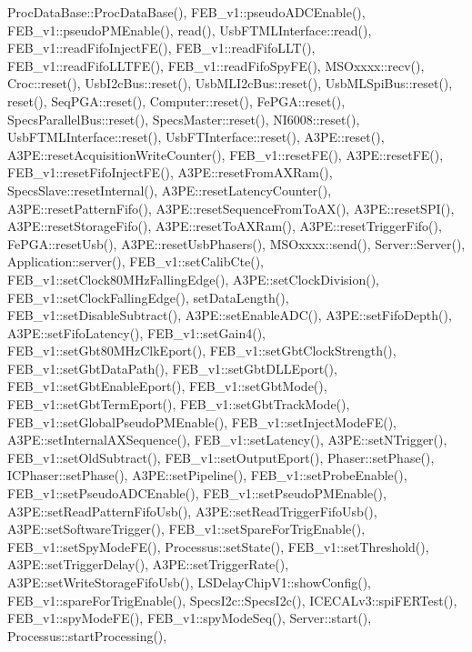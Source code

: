 Proc\+Data\+Base\+::\+Proc\+Data\+Base(), F\+E\+B\+\_\+v1\+::pseudo\+A\+D\+C\+Enable(), F\+E\+B\+\_\+v1\+::pseudo\+P\+M\+Enable(), read(), Usb\+F\+T\+M\+L\+Interface\+::read(), F\+E\+B\+\_\+v1\+::read\+Fifo\+Inject\+F\+E(), F\+E\+B\+\_\+v1\+::read\+Fifo\+L\+L\+T(), F\+E\+B\+\_\+v1\+::read\+Fifo\+L\+L\+T\+F\+E(), F\+E\+B\+\_\+v1\+::read\+Fifo\+Spy\+F\+E(), M\+S\+Oxxxx\+::recv(), Croc\+::reset(), Usb\+I2c\+Bus\+::reset(), Usb\+M\+L\+I2c\+Bus\+::reset(), Usb\+M\+L\+Spi\+Bus\+::reset(), reset(), Seq\+P\+G\+A\+::reset(), Computer\+::reset(), Fe\+P\+G\+A\+::reset(), Specs\+Parallel\+Bus\+::reset(), Specs\+Master\+::reset(), N\+I6008\+::reset(), Usb\+F\+T\+M\+L\+Interface\+::reset(), Usb\+F\+T\+Interface\+::reset(), A3\+P\+E\+::reset(), A3\+P\+E\+::reset\+Acquisition\+Write\+Counter(), F\+E\+B\+\_\+v1\+::reset\+F\+E(), A3\+P\+E\+::reset\+F\+E(), F\+E\+B\+\_\+v1\+::reset\+Fifo\+Inject\+F\+E(), A3\+P\+E\+::reset\+From\+A\+X\+Ram(), Specs\+Slave\+::reset\+Internal(), A3\+P\+E\+::reset\+Latency\+Counter(), A3\+P\+E\+::reset\+Pattern\+Fifo(), A3\+P\+E\+::reset\+Sequence\+From\+To\+A\+X(), A3\+P\+E\+::reset\+S\+P\+I(), A3\+P\+E\+::reset\+Storage\+Fifo(), A3\+P\+E\+::reset\+To\+A\+X\+Ram(), A3\+P\+E\+::reset\+Trigger\+Fifo(), Fe\+P\+G\+A\+::reset\+Usb(), A3\+P\+E\+::reset\+Usb\+Phasers(), M\+S\+Oxxxx\+::send(), Server\+::\+Server(), Application\+::server(), F\+E\+B\+\_\+v1\+::set\+Calib\+Cte(), F\+E\+B\+\_\+v1\+::set\+Clock80\+M\+Hz\+Falling\+Edge(), A3\+P\+E\+::set\+Clock\+Division(), F\+E\+B\+\_\+v1\+::set\+Clock\+Falling\+Edge(), set\+Data\+Length(), F\+E\+B\+\_\+v1\+::set\+Disable\+Subtract(), A3\+P\+E\+::set\+Enable\+A\+D\+C(), A3\+P\+E\+::set\+Fifo\+Depth(), A3\+P\+E\+::set\+Fifo\+Latency(), F\+E\+B\+\_\+v1\+::set\+Gain4(), F\+E\+B\+\_\+v1\+::set\+Gbt80\+M\+Hz\+Clk\+Eport(), F\+E\+B\+\_\+v1\+::set\+Gbt\+Clock\+Strength(), F\+E\+B\+\_\+v1\+::set\+Gbt\+Data\+Path(), F\+E\+B\+\_\+v1\+::set\+Gbt\+D\+L\+L\+Eport(), F\+E\+B\+\_\+v1\+::set\+Gbt\+Enable\+Eport(), F\+E\+B\+\_\+v1\+::set\+Gbt\+Mode(), F\+E\+B\+\_\+v1\+::set\+Gbt\+Term\+Eport(), F\+E\+B\+\_\+v1\+::set\+Gbt\+Track\+Mode(), F\+E\+B\+\_\+v1\+::set\+Global\+Pseudo\+P\+M\+Enable(), F\+E\+B\+\_\+v1\+::set\+Inject\+Mode\+F\+E(), A3\+P\+E\+::set\+Internal\+A\+X\+Sequence(), F\+E\+B\+\_\+v1\+::set\+Latency(), A3\+P\+E\+::set\+N\+Trigger(), F\+E\+B\+\_\+v1\+::set\+Old\+Subtract(), F\+E\+B\+\_\+v1\+::set\+Output\+Eport(), Phaser\+::set\+Phase(), I\+C\+Phaser\+::set\+Phase(), A3\+P\+E\+::set\+Pipeline(), F\+E\+B\+\_\+v1\+::set\+Probe\+Enable(), F\+E\+B\+\_\+v1\+::set\+Pseudo\+A\+D\+C\+Enable(), F\+E\+B\+\_\+v1\+::set\+Pseudo\+P\+M\+Enable(), A3\+P\+E\+::set\+Read\+Pattern\+Fifo\+Usb(), A3\+P\+E\+::set\+Read\+Trigger\+Fifo\+Usb(), A3\+P\+E\+::set\+Software\+Trigger(), F\+E\+B\+\_\+v1\+::set\+Spare\+For\+Trig\+Enable(), F\+E\+B\+\_\+v1\+::set\+Spy\+Mode\+F\+E(), Processus\+::set\+State(), F\+E\+B\+\_\+v1\+::set\+Threshold(), A3\+P\+E\+::set\+Trigger\+Delay(), A3\+P\+E\+::set\+Trigger\+Rate(), A3\+P\+E\+::set\+Write\+Storage\+Fifo\+Usb(), L\+S\+Delay\+Chip\+V1\+::show\+Config(), F\+E\+B\+\_\+v1\+::spare\+For\+Trig\+Enable(), Specs\+I2c\+::\+Specs\+I2c(), I\+C\+E\+C\+A\+Lv3\+::spi\+F\+E\+R\+Test(), F\+E\+B\+\_\+v1\+::spy\+Mode\+F\+E(), F\+E\+B\+\_\+v1\+::spy\+Mode\+Seq(), Server\+::start(), Processus\+::start\+Processing(), 